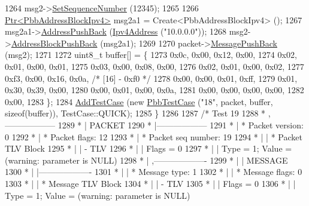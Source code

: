 \begin{DoxyCode}
1264     msg2->\hyperlink{classns3_1_1PbbMessage_a8c24696ac67507afa03c9750daccc47d}{SetSequenceNumber} (12345);
1265 
1266     \hyperlink{classns3_1_1Ptr}{Ptr<PbbAddressBlockIpv4>} msg2a1 = Create<PbbAddressBlockIpv4> ();
1267     msg2a1->\hyperlink{classns3_1_1PbbAddressBlock_a7be545a53d69bd426dbebcf752ed8371}{AddressPushBack} (\hyperlink{classns3_1_1Ipv4Address}{Ipv4Address} (\textcolor{stringliteral}{"10.0.0.0"}));
1268     msg2->\hyperlink{classns3_1_1PbbMessage_a5f623bad2fb1adde7da885e1c92d5311}{AddressBlockPushBack} (msg2a1);
1269 
1270     packet->\hyperlink{classns3_1_1PbbPacket_a4a3170001ef758d9c9c4375b8f089826}{MessagePushBack} (msg2);
1271 
1272     uint8\_t buffer[] = \{
1273       0x0c, 0x00, 0x12, 0x00,
1274       0x02, 0x01, 0x00, 0x01,
1275       0x03, 0x00, 0x08, 0x00,
1276       0x02, 0x01, 0x00, 0x02,
1277       0xf3, 0x00, 0x16, 0x0a,   \textcolor{comment}{/* [16] - 0xf0 */}
1278       0x00, 0x00, 0x01, 0xff,
1279       0x01, 0x30, 0x39, 0x00,
1280       0x00, 0x01, 0x00, 0x0a,
1281       0x00, 0x00, 0x00, 0x00,
1282       0x00,
1283     \};
1284     \hyperlink{classns3_1_1TestCase_a3718088e3eefd5d6454569d2e0ddd835}{AddTestCase} (\textcolor{keyword}{new} \hyperlink{classPbbTestCase}{PbbTestCase} (\textcolor{stringliteral}{"18"}, packet, buffer, \textcolor{keyword}{sizeof}(buffer)), 
      TestCase::QUICK);
1285   \}
1286 
1287   \textcolor{comment}{/* Test 19}
1288 \textcolor{comment}{         * ,------------------}
1289 \textcolor{comment}{         * |  PACKET}
1290 \textcolor{comment}{         * |------------------}
1291 \textcolor{comment}{         * | * Packet version:    0}
1292 \textcolor{comment}{         * | * Packet flags:  12}
1293 \textcolor{comment}{         * | * Packet seq number: 19}
1294 \textcolor{comment}{         * |    | * Packet TLV Block}
1295 \textcolor{comment}{         * |    |     - TLV}
1296 \textcolor{comment}{         * |    |         Flags = 0}
1297 \textcolor{comment}{         * |    |         Type = 1; Value = (warning: parameter is NULL)}
1298 \textcolor{comment}{         * |    ,-------------------}
1299 \textcolor{comment}{         * |    |  MESSAGE}
1300 \textcolor{comment}{         * |    |-------------------}
1301 \textcolor{comment}{         * |    | * Message type:       1}
1302 \textcolor{comment}{         * |    | * Message flags:  0}
1303 \textcolor{comment}{         * |    | * Message TLV Block}
1304 \textcolor{comment}{         * |    |     - TLV}
1305 \textcolor{comment}{         * |    |         Flags = 0}
1306 \textcolor{comment}{         * |    |         Type = 1; Value = (warning: parameter is NULL)}

\end{DoxyCode}

